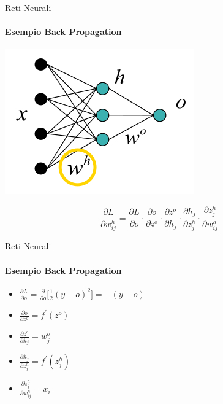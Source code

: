 \documentclass[
 ]{beamer}
\begin{document}
\begin{frame}{Reti Neurali}
    \framesubtitle{Esempio Back Propagation}
    
    \begin{center}
      \includegraphics[scale = 0.4]{back2.png}
    \end{center}
    
    \bigskip  

     \begin{equation*}
         \frac{\partial L}{\partial w_{ij}^{h}} =  \frac{\partial L}{\partial o} \cdot \frac{\partial o}{\partial z^{o}} \cdot \frac{\partial z^{o}}{\partial h_j} \cdot \frac{\partial h_j}{\partial z_j^{h}} \cdot \frac{\partial z_j^{h}}{\partial w_{ij}^{h}}
     \end{equation*}            
\end{frame}

\begin{frame}{Reti Neurali}
    \framesubtitle{Esempio Back Propagation}
    \begin{itemize} [<+->]
        \setlength\itemsep{2em}
        
        \item[] \large \begin{center} $\frac{\partial L}{\partial o} = \frac{\partial}{\partial o} \big[ \frac{1}{2}(y - o)^{2} \big] = -(y - o)$ \end{center}
        \item[] \large \begin{center} $\frac{\partial o}{\partial z^{o}} = f^{\prime}(z^{o})$ \end{center}
        \item[] \large \begin{center} $\frac{\partial z^{o}}{\partial h_j} = w_j^{o}$ \end{center}
        \item[] \large \begin{center} $\frac{\partial h_j}{\partial z_j^{h}} = f^{\prime}(z_j^{h})$ \end{center}
        \item[] \large \begin{center} $\frac{\partial z_j^{h}}{\partial w_{ij}^{h}} = x_i$ \end{center}          
    \end{itemize}
\end{frame}
\end{document}
